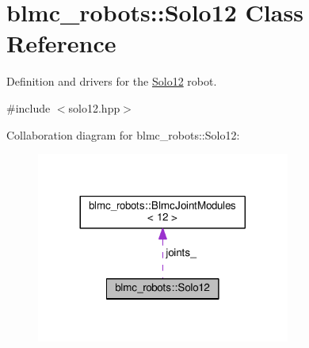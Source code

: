 \hypertarget{classblmc__robots_1_1Solo12}{}\section{blmc\+\_\+robots\+:\+:Solo12 Class Reference}
\label{classblmc__robots_1_1Solo12}


Definition and drivers for the \hyperlink{classblmc__robots_1_1Solo12}{Solo12} robot.  




{\ttfamily \#include $<$solo12.\+hpp$>$}



Collaboration diagram for blmc\+\_\+robots\+:\+:Solo12\+:
\nopagebreak
\begin{figure}[H]
\begin{center}
\leavevmode
\includegraphics[width=236pt]{classblmc__robots_1_1Solo12__coll__graph}
\end{center}
\end{figure}
